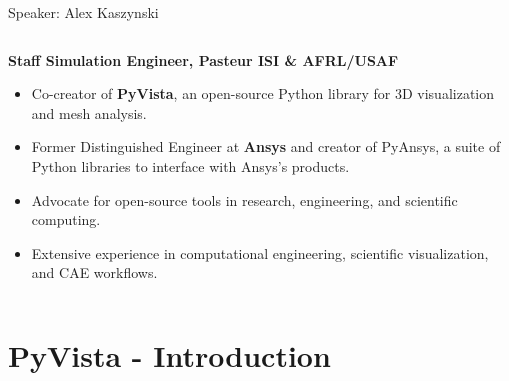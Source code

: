 \documentclass[t]{beamer}
\begin{document}
\begin{frame}{Speaker: Alex Kaszynski}
\begin{columns}
\begin{column}{0.7\textwidth}
            \textbf{Staff Simulation Engineer, Pasteur ISI \& AFRL/USAF}
            \begin{itemize}[leftmargin=10pt, label=•]
                \item Co-creator of \textbf{PyVista}, an open-source Python library for 3D visualization and mesh analysis.
                \item Former Distinguished Engineer at \textbf{Ansys} and creator of PyAnsys, a suite of Python libraries to interface with Ansys's products.
                \item Advocate for open-source tools in research, engineering, and scientific computing.
                \item Extensive experience in computational engineering, scientific visualization, and CAE workflows.
            \end{itemize}
        \end{column}
    \end{columns}

\end{frame}

\section{PyVista - Introduction}
\end{document}
